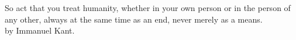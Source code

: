 \documentclass[aspectratio=169]{beamer}
\begin{document}
	\begin{frame}
		
		{\Large So act that you treat humanity, whether in your own person or in the person of any other, always at the same time as an end, never merely as a means.}\\ 
		{by Immanuel Kant.}
		
	\end{frame}
\end{document}

